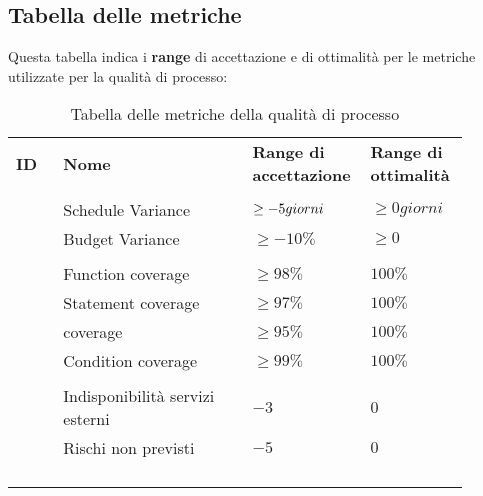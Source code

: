\documentclass[PianoDiQualifica.tex]{subfiles}
\begin{document}
\subsection{Tabella delle metriche}
Questa tabella indica i \textbf{range} di accettazione e di ottimalità per le metriche utilizzate per la qualità di processo:
\begin{table}[H]
	\begin{center}
		\begin{tabu} to 
			\tableHeaderStyle
			
			\textbf{ID} & \textbf{Nome} & \textbf{Range di accettazione} & \textbf{Range di ottimalità}\\
			
			\\
			 & Schedule Variance & $ \geq -5 \space giorni $ & $ \geq 0 giorni $ \\
			 & Budget Variance & $ \geq -10\% $ & $ \geq 0 $ \\
			
			\hline
			\\
			 & Function coverage & $ \geq 98\% $ & $ 100\% $\\
			 & Statement coverage &  $ \geq 97\% $& $ 100\% $\\
			 &  coverage & $ \geq 95\% $ & $ 100\% $\\
			 & Condition coverage & $ \geq 99\% $ & $ 100\% $\\

			\hline
			\\
			 & Indisponibilità servizi esterni & $ -3 $ & $ 0 $\\
			 & Rischi non previsti & $ -5 $ & $ 0 $\\ 		
			
			\hline
			\\
			 & & & \\
			\item {} & & & \\
			\item {} & & & \\
				
		\end{tabu}
		\caption{Tabella delle metriche della qualità di processo}
		\vspace{-1em}
	\end{center}
\end{table}
\end{document}
